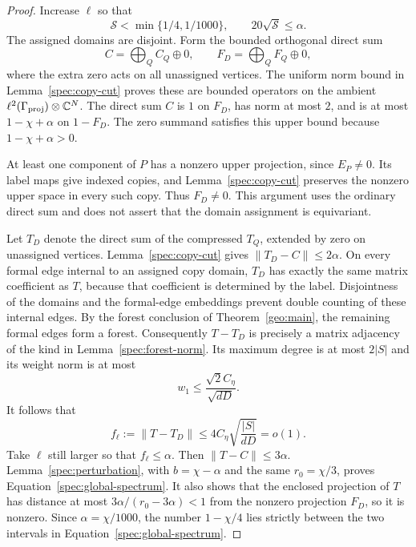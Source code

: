 \begin{proof}
Increase $\ell$ so that
\begin{equation}
 \mathcal S<\min\{1/4,1/1000\},\qquad
                    20\sqrt{\mathcal S}\leq\alpha.
 \label{spec:S-final-choice}
\end{equation}
The assigned domains are disjoint.  Form the bounded orthogonal direct
sum
\[
       C=\bigoplus_Q C_Q\oplus0,
       \qquad F_D=\bigoplus_Q F_Q\oplus0,
\]
where the extra zero acts on all unassigned vertices.  The uniform norm
bound in Lemma~\ref{spec:copy-cut} proves these are bounded operators on
the ambient $\ell^2(\Gamma_{\mathrm{proj}})\otimes\mathbb C^N$.  The direct sum $C$ is
$1$ on $F_D$, has norm at most $2$, and is at most $1-\chi+\alpha$ on
$1-F_D$.  The zero summand satisfies this upper bound because
$1-\chi+\alpha>0$.

At least one component of $P$ has a nonzero upper projection, since
$E_P\ne0$.  Its label maps give indexed copies, and
Lemma~\ref{spec:copy-cut} preserves the nonzero upper space in every such
copy.  Thus $F_D\ne0$.  This argument uses the ordinary direct sum and
does not assert that the domain assignment is equivariant.

Let $T_D$ denote the direct sum of the compressed $T_Q$, extended by zero
on unassigned vertices.  Lemma~\ref{spec:copy-cut} gives
$\|T_D-C\|\leq2\alpha$.  On every formal edge internal to an assigned
copy domain, $T_D$ has exactly the same matrix coefficient as $T$,
because that coefficient is determined by the label.  Disjointness of
the domains and the formal-edge embeddings prevent double counting of
these internal edges.  By the forest conclusion of
Theorem~\ref{geo:main}, the remaining formal edges form a forest.
Consequently $T-T_D$ is precisely a matrix adjacency of the kind in
Lemma~\ref{spec:forest-norm}.  Its maximum degree is at most $2|S|$ and
its weight norm is at most
\[
       w_1\leq\frac{\sqrt2 C_\eta}{\sqrt{dD}}.
\]
It follows that
\begin{equation}
       f_\ell:=\|T-T_D\|
          \leq4C_\eta\sqrt{\frac{|S|}{dD}}=o(1).
 \label{spec:forest-error}
\end{equation}
Take $\ell$ still larger so that $f_\ell\leq\alpha$.  Then
$\|T-C\|\leq3\alpha$.  Lemma~\ref{spec:perturbation}, with
$b=\chi-\alpha$ and the same $r_0=\chi/3$, proves
Equation~\eqref{spec:global-spectrum}.  It also shows that the enclosed
projection of $T$ has distance at most
$3\alpha/(r_0-3\alpha)<1$ from the nonzero projection $F_D$, so it is
nonzero.  Since $\alpha=\chi/1000$, the number $1-\chi/4$ lies strictly
between the two intervals in Equation~\eqref{spec:global-spectrum}.


\end{proof}
